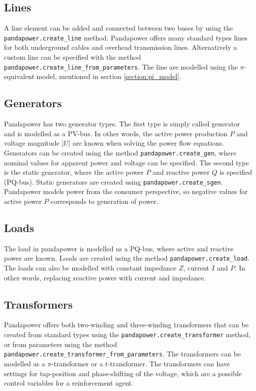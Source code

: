 \documentclass[class=book, crop=false]{standalone}
\begin{document}
\subsection{Lines}
A line element can be added and connected between two buses by using the \texttt{pandapower.create\_line} method. Pandapower offers many standard types lines for both underground cables and overhead transmission lines. Alternatively a custom line can be specified with the method \texttt{pandapower.create\_line\_from\_parameters}. The line are modelled using the $\pi$-equivalent model, mentioned in section \ref{section:pi_model}.

\subsection{Generators}
Pandapower has two generator types. The first type is simply called generator and is modelled as a PV-bus. In other words, the active power production $P$ and voltage magnitude $|U|$ are known when solving the power flow equations. Generators can be created using the method \texttt{pandapower.create\_gen}, where nominal values for apparent power and voltage can be specified. The second type is the static generator, where the active power $P$ and reactive power $Q$ is specified (PQ-bus). Static generators are created using \texttt{pandapower.create\_sgen}. Pandapower models power from the consumer perspective, so negative values for active power $P$ corresponds to generation of power.

\subsection{Loads}
The load in pandapower is modelled as a PQ-bus, where active and reactive power are known. Loads are created using the method \texttt{pandapower.create\_load}. The loads can also be modelled with constant impedance $Z$, current $I$ and $P$. In other words, replacing reactive power with current and impedance.

\subsection{Transformers}
Pandapower offers both two-winding and three-winding transformers that can be created from standard types using the \texttt{pandapower.create\_transformer} method, or from parameters using the method
\texttt{pandapower.create\_transformer\_from\_parameters}. The transformers can be modelled as a $\pi$-transformer or a $t$-transformer. The transformers can have settings for tap-position and phase-shifting of the voltage, which are a possible control variables for a reinforcement agent.  
\end{document}
